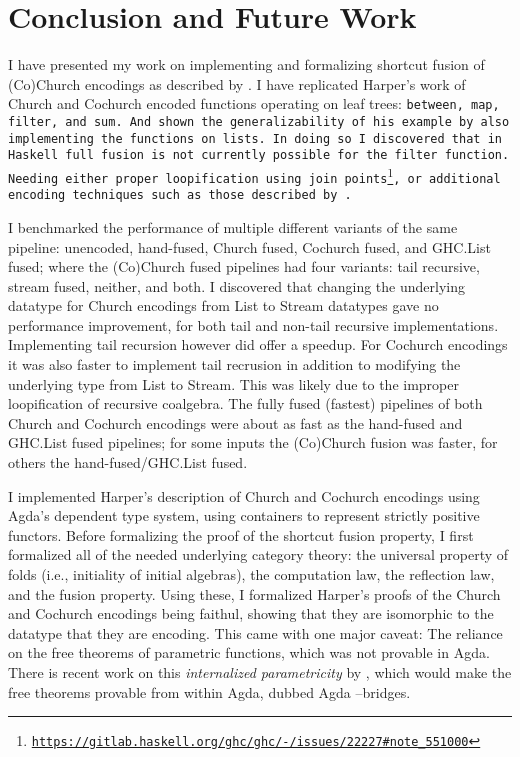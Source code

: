 \section{Conclusion and Future Work}
I have presented my work on implementing and formalizing shortcut fusion of (Co)Church encodings as described by \cite{Harper2011}.
I have replicated Harper's work of Church and Cochurch encoded functions operating on leaf trees: \tt{between}, \tt{map}, \tt{filter}, and \tt{sum}.
And shown the generalizability of his example by also implementing the functions on lists.
In doing so I discovered that in Haskell full fusion is not currently possible for the filter function.
Needing either proper loopification using join points\footnote{\url{https://gitlab.haskell.org/ghc/ghc/-/issues/22227\#note_551000}}, or additional encoding techniques such as those described by \cite{Coutts2007}.

I benchmarked the performance of multiple different variants of the same pipeline: unencoded, hand-fused, Church fused, Cochurch fused, and GHC.List fused; where the (Co)Church fused pipelines had four variants: tail recursive, stream fused, neither, and both.
I discovered that changing the underlying datatype for Church encodings from List to Stream datatypes gave no performance improvement, for both tail and non-tail recursive implementations. Implementing tail recursion however did offer a speedup.
For Cochurch encodings it was also faster to implement tail recrusion in addition to modifying the underlying type from List to Stream. This was likely due to the improper loopification of recursive coalgebra.
The fully fused (fastest) pipelines of both Church and Cochurch encodings were about as fast as the hand-fused and GHC.List fused pipelines; for some inputs the (Co)Church fusion was faster, for others the hand-fused/GHC.List fused.

I implemented Harper's description of Church and Cochurch encodings using Agda's dependent type system, using containers to represent strictly positive functors.
Before formalizing the proof of the shortcut fusion property, I first formalized all of the needed underlying category theory: the universal property of folds (i.e., initiality of initial algebras), the computation law, the reflection law, and the fusion property.
Using these, I formalized Harper's proofs of the Church and Cochurch encodings being faithul, showing that they are isomorphic to the datatype that they are encoding.
This came with one major caveat: The reliance on the free theorems of parametric functions, which was not provable in Agda.
There is recent work on this \textit{internalized parametricity} by \cite{Muylder2024}, which would make the free theorems provable from within Agda, dubbed Agda --bridges.


